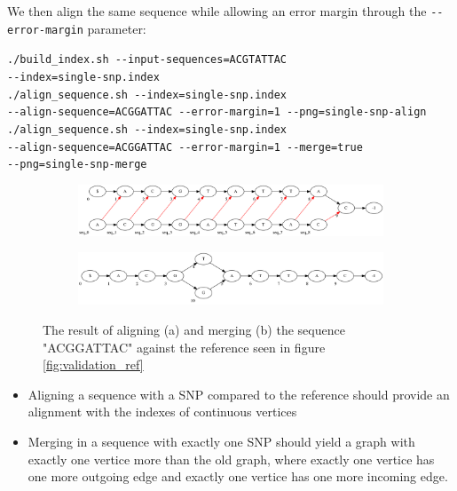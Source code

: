 \documentclass[thesis.tex]{subfiles}
\begin{document}
\clearpage\noindent
We then align the same sequence while allowing an error margin through the \texttt{-{}-error-margin} parameter:\\
\par\noindent
\texttt{./build\_index.sh -{}-input-sequences=ACGTATTAC\\
-{}-index=single-snp.index}\\
\texttt{./align\_sequence.sh -{}-index=single-snp.index\\
-{}-align-sequence=ACGGATTAC -{}-error-margin=1 -{}-png=single-snp-align}\\
\texttt{./align\_sequence.sh -{}-index=single-snp.index\\
-{}-align-sequence=ACGGATTAC -{}-error-margin=1 -{}-merge=true \\
-{}-png=single-snp-merge}\\
\begin{figure}[!h]
  \begin{mdframed}
  \begin{subfigure}[t]{\textwidth}
      \includegraphics[width=\textwidth]{output/single-snp-align.png}
    \subcaption{}
  \end{subfigure}
  \begin{subfigure}[t]{\textwidth}
      \includegraphics[width=\textwidth]{output/single-snp-merge.png}
    \subcaption{}
  \end{subfigure} 
\end{mdframed}
  \caption{The result of aligning (a) and merging (b) the sequence "ACGGATTAC" against the reference seen in figure \ref{fig:validation_ref}}
  \label{fig:validation_single_snp}
\end{figure}
\begin{itemize}
\item Aligning a sequence with a SNP compared to the reference should provide an alignment with the indexes of continuous vertices
\item Merging in a sequence with exactly one SNP should yield a graph with exactly one vertice more than the old graph, where exactly one vertice has one more outgoing edge and exactly one vertice has one more incoming edge.
\end{itemize}
\clearpage
\end{document}
